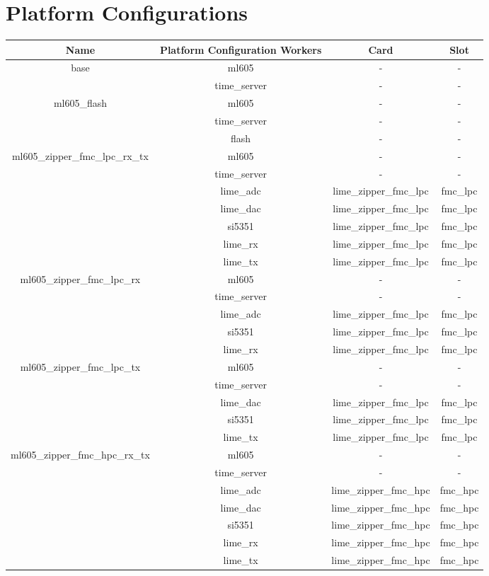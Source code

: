 \documentclass{article}
\begin{document}
\section*{Platform Configurations}
	\begin{tabular}{|c|c|c|c|}
		\hline
		\rowcolor{blue}
		Name & Platform Configuration Workers & Card & Slot \\
		\hline
		\multirow{2}{*}{base} &ml605 & - & - \\ &time\_server & - & - \\
		\hline
		\multirow{2}{*}{ml605\_flash} &ml605 & - & - \\ &time\_server & - & - \\ &flash & - & - \\
		\hline
		\multirow{5}{*}{ml605\_zipper\_fmc\_lpc\_rx\_tx} &ml605 & - & - \\ &time\_server & - & - \\ &lime\_adc & lime\_zipper\_fmc\_lpc & fmc\_lpc \\ &lime\_dac & lime\_zipper\_fmc\_lpc & fmc\_lpc \\ &si5351 & lime\_zipper\_fmc\_lpc & fmc\_lpc \\ &lime\_rx & lime\_zipper\_fmc\_lpc & fmc\_lpc \\ &lime\_tx & lime\_zipper\_fmc\_lpc & fmc\_lpc \\
		\hline
		\multirow{5}{*}{ml605\_zipper\_fmc\_lpc\_rx} &ml605 & - & - \\ &time\_server & - & - \\ &lime\_adc & lime\_zipper\_fmc\_lpc & fmc\_lpc \\  &si5351 & lime\_zipper\_fmc\_lpc & fmc\_lpc \\ &lime\_rx & lime\_zipper\_fmc\_lpc & fmc\_lpc \\
		\hline
		\multirow{5}{*}{ml605\_zipper\_fmc\_lpc\_tx} &ml605 & - & - \\ &time\_server & - & - \\ &lime\_dac & lime\_zipper\_fmc\_lpc & fmc\_lpc \\  &si5351 & lime\_zipper\_fmc\_lpc & fmc\_lpc \\ &lime\_tx & lime\_zipper\_fmc\_lpc & fmc\_lpc \\
		\hline
		\multirow{5}{*}{ml605\_zipper\_fmc\_hpc\_rx\_tx} &ml605 & - & - \\ &time\_server & - & - \\ &lime\_adc & lime\_zipper\_fmc\_hpc & fmc\_hpc \\ &lime\_dac & lime\_zipper\_fmc\_hpc & fmc\_hpc \\ &si5351 & lime\_zipper\_fmc\_hpc & fmc\_hpc \\ &lime\_rx & lime\_zipper\_fmc\_hpc & fmc\_hpc \\ &lime\_tx & lime\_zipper\_fmc\_hpc & fmc\_hpc \\

\end{tabular}
\end{document}
